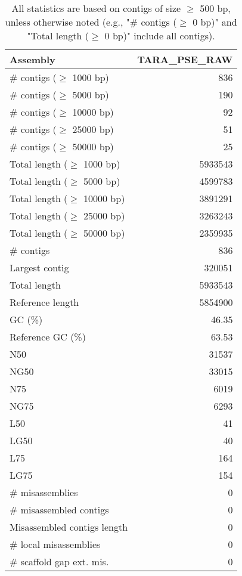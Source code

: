 \documentclass[12pt,a4paper]{article}
\begin{document}
\begin{table}[ht]
\begin{center}
\caption{All statistics are based on contigs of size $\geq$ 500 bp, unless otherwise noted (e.g., "\# contigs ($\geq$ 0 bp)" and "Total length ($\geq$ 0 bp)" include all contigs).}
\begin{tabular}{|l*{1}{|r}|}
\hline
Assembly & TARA\_PSE\_RAW \\ \hline
\# contigs ($\geq$ 1000 bp) & 836 \\ \hline
\# contigs ($\geq$ 5000 bp) & 190 \\ \hline
\# contigs ($\geq$ 10000 bp) & 92 \\ \hline
\# contigs ($\geq$ 25000 bp) & 51 \\ \hline
\# contigs ($\geq$ 50000 bp) & 25 \\ \hline
Total length ($\geq$ 1000 bp) & 5933543 \\ \hline
Total length ($\geq$ 5000 bp) & 4599783 \\ \hline
Total length ($\geq$ 10000 bp) & 3891291 \\ \hline
Total length ($\geq$ 25000 bp) & 3263243 \\ \hline
Total length ($\geq$ 50000 bp) & 2359935 \\ \hline
\# contigs & 836 \\ \hline
Largest contig & 320051 \\ \hline
Total length & 5933543 \\ \hline
Reference length & 5854900 \\ \hline
GC (\%) & 46.35 \\ \hline
Reference GC (\%) & 63.53 \\ \hline
N50 & 31537 \\ \hline
NG50 & 33015 \\ \hline
N75 & 6019 \\ \hline
NG75 & 6293 \\ \hline
L50 & 41 \\ \hline
LG50 & 40 \\ \hline
L75 & 164 \\ \hline
LG75 & 154 \\ \hline
\# misassemblies & 0 \\ \hline
\# misassembled contigs & 0 \\ \hline
Misassembled contigs length & 0 \\ \hline
\# local misassemblies & 0 \\ \hline
\# scaffold gap ext. mis. & 0 \\ \hline

\end{tabular}
\end{center}
\end{table}
\end{document}
